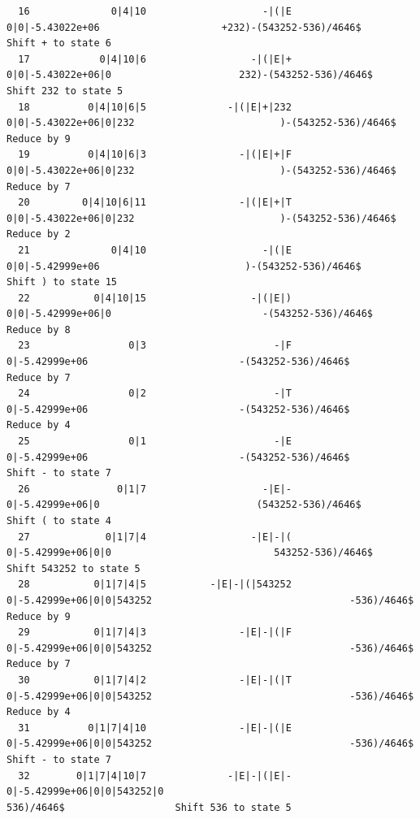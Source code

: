 \documentclass[UTF8]{ctexart}
\begin{document}
\begin{lstlisting}
  16              0|4|10                    -|(|E                   0|0|-5.43022e+06                     +232)-(543252-536)/4646$                   Shift + to state 6
  17            0|4|10|6                  -|(|E|+                 0|0|-5.43022e+06|0                      232)-(543252-536)/4646$                   Shift 232 to state 5
  18          0|4|10|6|5              -|(|E|+|232             0|0|-5.43022e+06|0|232                         )-(543252-536)/4646$               Reduce by 9
  19          0|4|10|6|3                -|(|E|+|F             0|0|-5.43022e+06|0|232                         )-(543252-536)/4646$               Reduce by 7
  20         0|4|10|6|11                -|(|E|+|T             0|0|-5.43022e+06|0|232                         )-(543252-536)/4646$               Reduce by 2
  21              0|4|10                    -|(|E                   0|0|-5.42999e+06                         )-(543252-536)/4646$                   Shift ) to state 15
  22           0|4|10|15                  -|(|E|)                 0|0|-5.42999e+06|0                          -(543252-536)/4646$               Reduce by 8
  23                 0|3                      -|F                     0|-5.42999e+06                          -(543252-536)/4646$               Reduce by 7
  24                 0|2                      -|T                     0|-5.42999e+06                          -(543252-536)/4646$               Reduce by 4
  25                 0|1                      -|E                     0|-5.42999e+06                          -(543252-536)/4646$                   Shift - to state 7
  26               0|1|7                    -|E|-                   0|-5.42999e+06|0                           (543252-536)/4646$                   Shift ( to state 4
  27             0|1|7|4                  -|E|-|(                 0|-5.42999e+06|0|0                            543252-536)/4646$                   Shift 543252 to state 5
  28           0|1|7|4|5           -|E|-|(|543252          0|-5.42999e+06|0|0|543252                                  -536)/4646$               Reduce by 9
  29           0|1|7|4|3                -|E|-|(|F          0|-5.42999e+06|0|0|543252                                  -536)/4646$               Reduce by 7
  30           0|1|7|4|2                -|E|-|(|T          0|-5.42999e+06|0|0|543252                                  -536)/4646$               Reduce by 4
  31          0|1|7|4|10                -|E|-|(|E          0|-5.42999e+06|0|0|543252                                  -536)/4646$                   Shift - to state 7
  32        0|1|7|4|10|7              -|E|-|(|E|-        0|-5.42999e+06|0|0|543252|0                                   536)/4646$                   Shift 536 to state 5

\end{lstlisting}
\end{document}
